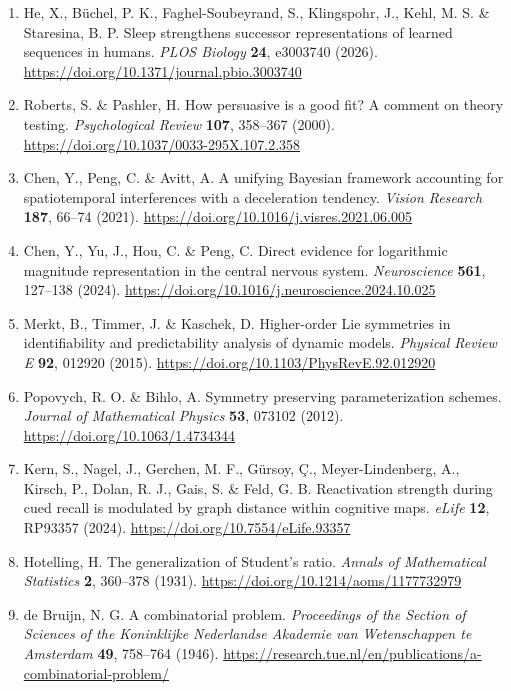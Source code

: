 \documentclass[11pt,a4paper]{article}
\begin{document}
\begin{enumerate}
  H. Predictable motion is progressively extrapolated across temporally
  distinct processing stages in the human visual cortex. \emph{PLOS
  Biology} \textbf{23}, e3003189 (2025).
  \url{https://doi.org/10.1371/journal.pbio.3003189}
\item
  He, X., Büchel, P. K., Faghel-Soubeyrand, S., Klingspohr, J., Kehl, M.
  S. \& Staresina, B. P. Sleep strengthens successor representations of
  learned sequences in humans. \emph{PLOS Biology} \textbf{24}, e3003740
  (2026). \url{https://doi.org/10.1371/journal.pbio.3003740}
\item
  Roberts, S. \& Pashler, H. How persuasive is a good fit? A comment on
  theory testing. \emph{Psychological Review} \textbf{107}, 358–367
  (2000). \url{https://doi.org/10.1037/0033-295X.107.2.358}
\item
  Chen, Y., Peng, C. \& Avitt, A. A unifying Bayesian framework
  accounting for spatiotemporal interferences with a deceleration
  tendency. \emph{Vision Research} \textbf{187}, 66–74 (2021).
  \url{https://doi.org/10.1016/j.visres.2021.06.005}
\item
  Chen, Y., Yu, J., Hou, C. \& Peng, C. Direct evidence for logarithmic
  magnitude representation in the central nervous system.
  \emph{Neuroscience} \textbf{561}, 127–138 (2024).
  \url{https://doi.org/10.1016/j.neuroscience.2024.10.025}
\item
  Merkt, B., Timmer, J. \& Kaschek, D. Higher-order Lie symmetries in
  identifiability and predictability analysis of dynamic models.
  \emph{Physical Review E} \textbf{92}, 012920 (2015).
  \url{https://doi.org/10.1103/PhysRevE.92.012920}
\item
  Popovych, R. O. \& Bihlo, A. Symmetry preserving parameterization
  schemes. \emph{Journal of Mathematical Physics} \textbf{53}, 073102
  (2012). \url{https://doi.org/10.1063/1.4734344}
\item
  Kern, S., Nagel, J., Gerchen, M. F., Gürsoy, Ç., Meyer-Lindenberg, A.,
  Kirsch, P., Dolan, R. J., Gais, S. \& Feld, G. B. Reactivation
  strength during cued recall is modulated by graph distance within
  cognitive maps. \emph{eLife} \textbf{12}, RP93357 (2024).
  \url{https://doi.org/10.7554/eLife.93357}
\item
  Hotelling, H. The generalization of Student's ratio. \emph{Annals of
  Mathematical Statistics} \textbf{2}, 360–378 (1931).
  \url{https://doi.org/10.1214/aoms/1177732979}
\item
  de Bruijn, N. G. A combinatorial problem. \emph{Proceedings of the
  Section of Sciences of the Koninklijke Nederlandse Akademie van
  Wetenschappen te Amsterdam} \textbf{49}, 758–764 (1946).
  \url{https://research.tue.nl/en/publications/a-combinatorial-problem/}
\end{enumerate}
\end{document}
